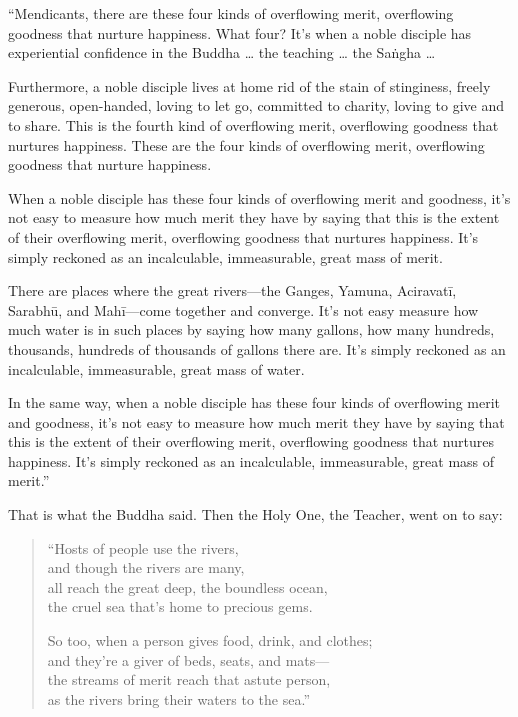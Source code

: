 \documentclass[12pt,openany]{book}%
\begin{document}
“Mendicants, there are these four kinds of overflowing merit, overflowing goodness that nurture happiness. What four? It’s when a noble disciple has experiential confidence in the Buddha … the teaching … the \textsanskrit{Saṅgha} … 

Furthermore, a noble disciple lives at home rid of the stain of stinginess, freely generous, open-handed, loving to let go, committed to charity, loving to give and to share. This is the fourth kind of overflowing merit, overflowing goodness that nurtures happiness. These are the four kinds of overflowing merit, overflowing goodness that nurture happiness. 

When a noble disciple has these four kinds of overflowing merit and goodness, it’s not easy to measure how much merit they have by saying that this is the extent of their overflowing merit, overflowing goodness that nurtures happiness. It’s simply reckoned as an incalculable, immeasurable, great mass of merit. 

There are places where the great rivers—the Ganges, Yamuna, \textsanskrit{Aciravatī}, \textsanskrit{Sarabhū}, and \textsanskrit{Mahī}—come together and converge. It’s not easy measure how much water is in such places by saying how many gallons, how many hundreds, thousands, hundreds of thousands of gallons there are. It’s simply reckoned as an incalculable, immeasurable, great mass of water. 

In the same way, when a noble disciple has these four kinds of overflowing merit and goodness, it’s not easy to measure how much merit they have by saying that this is the extent of their overflowing merit, overflowing goodness that nurtures happiness. It’s simply reckoned as an incalculable, immeasurable, great mass of merit.” 

That is what the Buddha said. Then the Holy One, the Teacher, went on to say: 

\begin{verse}%
“Hosts of people use the rivers, \\
and though the rivers are many, \\
all reach the great deep, the boundless ocean, \\
the cruel sea that’s home to precious gems. 

So too, when a person gives food, drink, and clothes; \\
and they’re a giver of beds, seats, and mats—\\
the streams of merit reach that astute person, \\
as the rivers bring their waters to the sea.” 

%
\end{verse}
\end{document}
